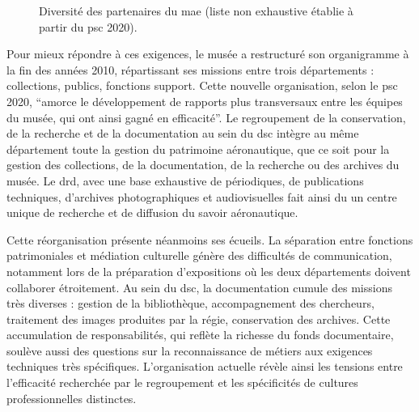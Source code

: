 \begin{figure}[htbp]
	
	\caption{Diversité des partenaires du \ac{mae} (liste non exhaustive établie à partir du \ac{psc} 2020).}
	\label{fig:schem_partenaires}
\end{figure}

Pour mieux répondre à ces exigences, le musée a restructuré son organigramme à la fin des années 2010, répartissant ses missions entre trois départements : collections, publics, fonctions support. Cette nouvelle organisation, selon le \ac{psc} 2020, \enquote{amorce le développement de rapports plus transversaux entre les équipes du musée, qui ont ainsi gagné en efficacité}. Le regroupement de la conservation, de la recherche et de la documentation au sein du \ac{dsc} intègre au même département toute la gestion du patrimoine aéronautique, que ce soit pour la gestion des collections, de la documentation, de la recherche  ou des archives du musée. Le \ac{drd}, avec une base exhaustive de périodiques, de publications techniques, d'archives photographiques et audiovisuelles fait ainsi du \mae un centre unique de recherche et de diffusion du savoir aéronautique.

Cette réorganisation présente néanmoins ses écueils. La séparation entre fonctions patrimoniales et médiation culturelle génère des difficultés de communication, notamment lors de la préparation d'expositions où les deux départements doivent collaborer étroitement. Au sein du \ac{dsc}, la documentation cumule des missions très diverses : gestion de la bibliothèque, accompagnement des chercheurs, traitement des images produites par la régie, conservation des archives. Cette accumulation de responsabilités, qui reflète la richesse du fonds documentaire, soulève aussi des questions sur la reconnaissance de métiers aux exigences techniques très spécifiques. L'organisation actuelle révèle ainsi les tensions entre l'efficacité recherchée par le regroupement et les spécificités de cultures professionnelles distinctes.